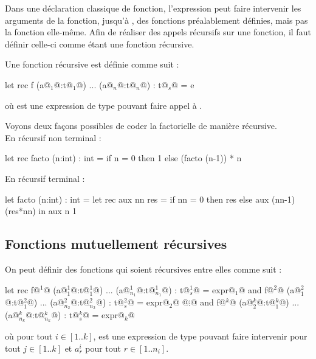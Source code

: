 		Dans une déclaration classique de fonction, l'expression  peut faire intervenir les arguments de la fonction,  jusqu'à , des fonctions préalablement définies, mais pas la fonction  elle-même. Afin de réaliser des appels récursifs sur une fonction, il faut définir celle-ci comme étant une fonction récursive.
 		
 		\begin{Syntaxe}
 			Une fonction récursive est définie comme suit : 
 				\begin{Caml}
 					  let rec f (a@$_1$@:t@$_1$@) ... (a@$_n$@:t@$_n$@) : t@$_s$@ = e
 				\end{Caml}
 			où  est une expression de type  pouvant faire appel à .
 		\end{Syntaxe}
 	
 		\begin{Exemple}
 			Voyons deux façons possibles de coder la factorielle de manière récursive. \\
 			En récursif non terminal : 
 				\begin{Caml}
 					  let rec facto (n:int) : int =
 						  if n = 0 then 1
 						  else (facto (n-1)) * n
 				\end{Caml}
 			En récursif terminal : 
 				\begin{Caml}
 				  let facto (n:int) : int =
 					  let rec aux nn res =
 						  if nn = 0 then res
 						  else aux (nn-1) (res*nn)
 					  in aux n 1
 				\end{Caml}
 		\end{Exemple}
 	
	\subsection{Fonctions mutuellement récursives}
		
		\begin{Syntaxe}
			On peut définir des fonctions qui soient récursives entre elles comme suit : 
				\begin{Caml}
				   let rec f@$^1$@ (a@$^1_1$@:t@$^1_1$@) ... (a@$^1_{n_1}$@:t@$^1_{n_1}$@) : t@$^1_s$@ = expr@$_1$@
				   and f@$^2$@ (a@$^2_1$@:t@$^2_1$@) ... (a@$^2_{n_2}$@:t@$^2_{n_2}$@) : t@$^2_s$@ = expr@$_2$@
					@$\vdots$@
				   and f@$^k$@ (a@$^k_2$@:t@$^k_1$@) ... (a@$^k_{n_k}$@:t@$^k_{n_k}$@) : t@$^k_s$@ = expr@$_k$@
				\end{Caml}
			où pour tout \(i\in[1..k]\),  est une expression de type  pouvant faire intervenir  pour tout \(j\in[1..k]\) et \(a^i_r\) pour tout \(r\in[1..n_i]\).
		\end{Syntaxe}
 		
